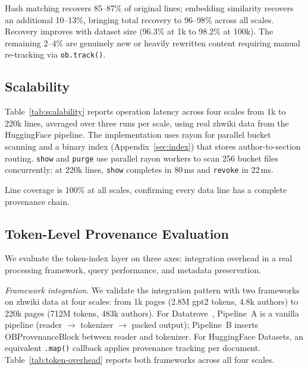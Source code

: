 Hash matching recovers 85--87\% of original lines; embedding similarity recovers an additional 10--13\%, bringing total recovery to 96--98\% across all scales. Recovery improves with dataset size (96.3\% at 1k to 98.2\% at 100k). The remaining 2--4\% are genuinely new or heavily rewritten content requiring manual re-tracking via \texttt{ob.track()}.

\subsection{Scalability}
\label{sec:scalability}

Table~\ref{tab:scalability} reports operation latency across four scales from 1k to 220k lines, averaged over three runs per scale, using real zhwiki data from the HuggingFace pipeline. The implementation uses rayon for parallel bucket scanning and a binary index (Appendix~\ref{sec:index}) that stores author-to-section routing. \texttt{show} and \texttt{purge} use parallel rayon workers to scan 256 bucket files concurrently; at 220k lines, \texttt{show} completes in 80\,ms and \texttt{revoke} in 22\,ms.



Line coverage is 100\% at all scales, confirming every data line has a complete provenance chain.

\subsection{Token-Level Provenance Evaluation}
\label{sec:token-eval}

We evaluate the token-index layer on three axes: integration overhead in a real processing framework, query performance, and metadata preservation.

\emph{Framework integration}. We validate the integration pattern with two frameworks on zhwiki data at four scales: from 1k pages (2.8M gpt2 tokens, 4.8k authors) to 220k pages (712M tokens, 483k authors). For Datatrove~\cite{penedo2024datatrove}, Pipeline~A is a vanilla pipeline (reader $\rightarrow$ tokenizer $\rightarrow$ packed output); Pipeline~B inserts OBProvenanceBlock between reader and tokenizer. For HuggingFace Datasets, an equivalent \texttt{.map()} callback applies provenance tracking per document. Table~\ref{tab:token-overhead} reports both frameworks across all four scales.

